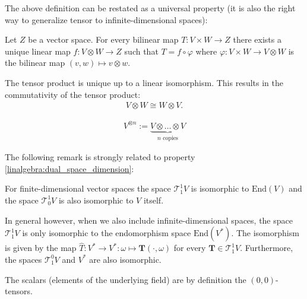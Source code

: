 
    The above definition can be restated as a universal property (it is also the right way to generalize tensor to infinite-dimensional spaces):
    \begin{uproperty}\label{tensor:prop:universal_property}
        Let $Z$ be a vector space. For every bilinear map $T:V\times W\rightarrow Z$ there exists a unique linear map $f:V\otimes W\rightarrow Z$ such that $T = f\circ\varphi$ where $\varphi:V\times W\rightarrow V\otimes W$ is the bilinear map $(v,w)\mapsto v\otimes w$.
    \end{uproperty}
    \begin{result}
        The tensor product is unique up to a linear isomorphism. This results in the commutativity of the tensor product:
        \begin{gather}
           \label{tensor:commutativity}
            V\otimes W \cong W\otimes V.
        \end{gather}
    \end{result}

    \begin{notation}
        \begin{gather}
            V^{\otimes n} := \underbrace{V\otimes\ldots\otimes V}_{n\text{ copies}}
        \end{gather}
    \end{notation}

    The following remark is strongly related to property \ref{linalgebra:dual_space_dimension}:
    \begin{remark}
        For finite-dimensional vector spaces the space $\mathcal{T}^1_1V$ is isomorphic to $\text{End}(V)$ and the space $\mathcal{T}^1_0V$ is also isomorphic to $V$ itself.

        In general however, when we also include infinite-dimensional spaces, the space $\mathcal{T}^1_1V$ is only isomorphic to the endomorphism space $\text{End}(V^*)$. The isomorphism is given by the map $\hat{T}:V^*\rightarrow V^*:\omega\mapsto\mathbf{T}(\cdot, \omega)$ for every $\mathbf{T}\in\mathcal{T}^1_1V$. Furthermore, the spaces $\mathcal{T}^0_1V$ and $V^*$ are also isomorphic.
    \end{remark}
    \begin{definition}[Scalar]
            The scalars (elements of the underlying field) are by definition the $(0,0)$-tensors.
    \end{definition}

